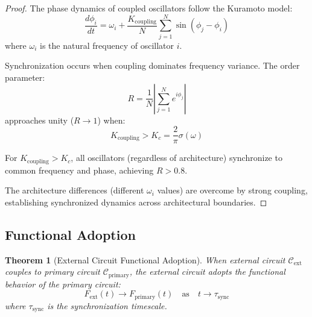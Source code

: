 \documentclass[12pt,a4paper]{article}
\theoremstyle{plain}
\newtheorem{theorem}{Theorem}[section]
\theoremstyle{definition}
\theoremstyle{remark}
\begin{document}
\begin{proof}
The phase dynamics of coupled oscillators follow the Kuramoto model:
\begin{equation}
\frac{d\phi_i}{dt} = \omega_i + \frac{K_{\text{coupling}}}{N} \sum_{j=1}^{N} \sin(\phi_j - \phi_i)
\end{equation}
where $\omega_i$ is the natural frequency of oscillator $i$.

Synchronization occurs when coupling dominates frequency variance. The order parameter:
\begin{equation}
R = \frac{1}{N} \left| \sum_{j=1}^{N} e^{i\phi_j} \right|
\end{equation}
approaches unity ($R \to 1$) when:
\begin{equation}
K_{\text{coupling}} > K_c = \frac{2}{\pi} \sigma(\omega)
\end{equation}

For $K_{\text{coupling}} > K_c$, all oscillators (regardless of architecture) synchronize to common frequency and phase, achieving $R > 0.8$.

The architecture differences (different $\omega_i$ values) are overcome by strong coupling, establishing synchronized dynamics across architectural boundaries.
\end{proof}

\subsection{Functional Adoption}

\begin{theorem}[External Circuit Functional Adoption]
\label{thm:functional_adoption}
When external circuit $\mathcal{C}_{\text{ext}}$ couples to primary circuit $\mathcal{C}_{\text{primary}}$, the external circuit adopts the functional behavior of the primary circuit:
\begin{equation}
F_{\text{ext}}(t) \to F_{\text{primary}}(t) \quad \text{as} \quad t \to \tau_{\text{sync}}
\end{equation}
where $\tau_{\text{sync}}$ is the synchronization timescale.
\end{theorem}
\end{document}
